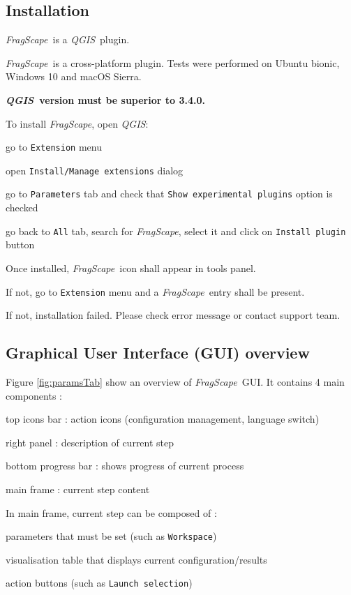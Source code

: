 \documentclass[11pt]{article}
\newcommand{\tool}{\emph{FragScape}}
\newcommand{\qgis}{\emph{QGIS}}
\let\tempone\itemize
\let\temptwo\enditemize
\renewenvironment{itemize}{\tempone\addtolength{\itemsep}{-0.5\baselineskip}}{\temptwo}
\renewenvironment{enumerate}{\tempone\addtolength{\itemsep}{-0.5\baselineskip}}{\temptwo}
\begin{document}
\subsection{Installation}

\tool\ is a \qgis\ plugin.

\tool\ is a cross-platform plugin. Tests were performed on Ubuntu bionic, Windows 10 and macOS Sierra.

\textbf{\color{red}\qgis\ version must be superior to 3.4.0.}
\frameboxend

To install \tool, open \qgis:
\begin{enumerate}
    \item go to \texttt{Extension} menu
    \item open \texttt{Install/Manage extensions} dialog
    \item go to \texttt{Parameters} tab and check that \texttt{Show experimental plugins} option is checked 
    \item go back to \texttt{All} tab, search for \tool, select it and click on \texttt{Install plugin} button
\end{enumerate}

Once installed, \tool\ icon  shall appear in tools panel.

If not, go to \texttt{Extension} menu and a \tool\ entry shall be present.

If not, installation failed. Please check error message or contact support team.

\subsection{Graphical User Interface (GUI) overview}

Figure \ref{fig:paramsTab} show an overview of \tool\ GUI. It contains 4 main components :
\begin{itemize}
    \item top icons bar : action icons (configuration management, language switch)
    \item right panel : description of current step
    \item bottom progress bar : shows progress of current process
    \item main frame : current step content
\end{itemize}

In main frame, current step can be composed of :
\begin{itemize}
    \item parameters that must be set (such as \texttt{Workspace})
    \item visualisation table that displays current configuration/results
    \item action buttons (such as \texttt{Launch selection})
\end{itemize}
\end{document}

